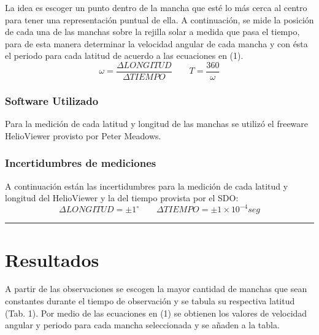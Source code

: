 \documentclass[11pt,letterpaper]{article}
\begin{document}
La idea es escoger un punto dentro de la mancha que esté lo más cerca al centro para tener una representación puntual de ella. A continuación, se mide la posición de cada una de las manchas sobre la rejilla solar a medida que pasa el tiempo, para de esta manera determinar la velocidad angular de cada mancha y con ésta el periodo para cada latitud de acuerdo a las ecuaciones en (1). 
\\

\begin{equation}
\omega =  \frac{\Delta LONGITUD}{\Delta TIEMPO} 
\quad
\quad
T =  \frac{360}{\omega} 
\end{equation}

\subsubsection{Software Utilizado}
 
Para la medición de cada latitud y longitud de las manchas se utilizó el freeware HelioViewer provisto por Peter Meadows.
\\

\subsubsection{Incertidumbres de mediciones}
 
A continuación están las incertidumbres para la medición de cada latitud y longitud del HelioViewer y la del tiempo provista por el SDO:
\\

\begin{equation}
\Delta LONGITUD =  \pm 1^{\circ}\mathrm{}
\quad
\quad
\Delta TIEMPO =  \pm 1 \times 10^{-4} seg
\end{equation}

 
\hrule

\section{Resultados}

A partir de las observaciones se escogen la mayor cantidad de manchas que sean constantes durante el tiempo de observación y se tabula su respectiva latitud (Tab. 1). Por medio de las ecuaciones en (1) se obtienen los valores de velocidad angular y periodo para cada mancha seleccionada y se añaden a la tabla.
\\ 
\end{document}
